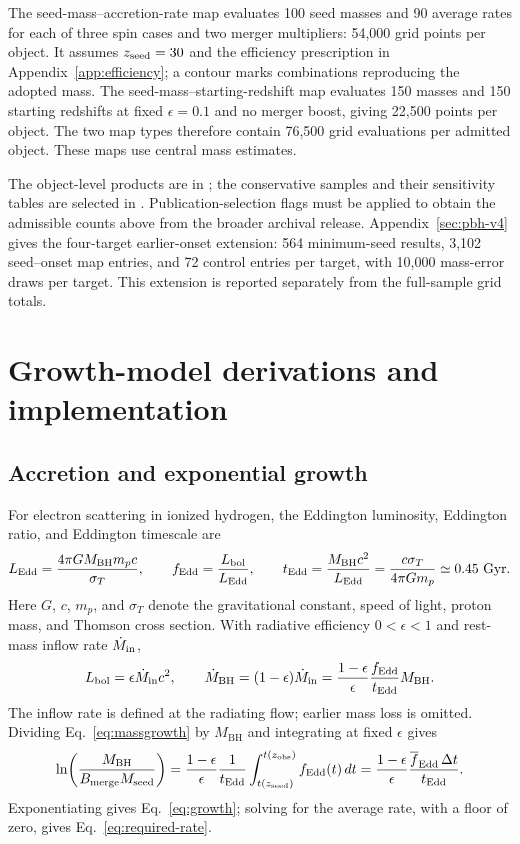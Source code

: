 \documentclass[pdflatex,sn-basic]{sn-jnl}
\newcommand{\fedd}{f_{\mathrm{Edd}}}
\newcommand{\mbh}{M_{\mathrm{BH}}}
\newcommand{\mseed}{M_{\mathrm{seed}}}
\begin{document}
The seed-mass--accretion-rate map evaluates 100 seed masses and 90 average
rates for each of three spin cases and two merger multipliers: 54,000 grid
points per object. It assumes $z_{\rm seed}=30$ and the efficiency prescription
in Appendix~\ref{app:efficiency}; a contour marks combinations reproducing the
adopted mass. The seed-mass--starting-redshift map evaluates 150 masses and
150 starting redshifts at fixed $\epsilon=0.1$ and no merger boost, giving
22,500 points per object. The two map types therefore contain 76,500 grid
evaluations per admitted object. These maps use central mass estimates.

The object-level products are in ; the conservative samples
and their sensitivity tables are selected in .
Publication-selection flags must be applied to obtain the admissible counts
above from the broader archival release. Appendix~\ref{sec:pbh-v4} gives the
four-target earlier-onset extension: 564 minimum-seed results, 3,102
seed--onset map entries, and 72 control entries per target, with 10,000
mass-error draws per target. This extension is reported separately from the
full-sample grid totals.


\FloatBarrier
\section{Growth-model derivations and implementation}
\label{app:derivations}

\subsection{Accretion and exponential growth}

For electron scattering in ionized hydrogen, the Eddington luminosity,
Eddington ratio, and Eddington timescale are
\begin{equation}
L_{\rm Edd}=\frac{4\pi G\mbh m_p c}{\sigma_T},\qquad
\fedd=\frac{L_{\rm bol}}{L_{\rm Edd}},\qquad
t_{\rm Edd}=\frac{\mbh c^2}{L_{\rm Edd}}
=\frac{c\sigma_T}{4\pi Gm_p}\simeq0.45\ {\rm Gyr}.
\label{eq:eddington}
\end{equation}
Here $G$, $c$, $m_p$, and $\sigma_T$ denote the gravitational constant,
speed of light, proton mass, and Thomson cross section. With radiative
efficiency $0<\epsilon<1$ and rest-mass inflow rate $\dot M_{\rm in}$,
\begin{equation}
L_{\rm bol}=\epsilon\dot M_{\rm in}c^2,\qquad
\dot\mbh=(1-\epsilon)\dot M_{\rm in}
=\frac{1-\epsilon}{\epsilon}\frac{\fedd}{t_{\rm Edd}}\mbh.
\label{eq:massgrowth}
\end{equation}
The inflow rate is defined at the radiating flow; earlier mass loss is omitted.
Dividing Eq.~\ref{eq:massgrowth} by $\mbh$ and integrating at fixed
$\epsilon$ gives
\begin{equation}
\ln\!\left(\frac{\mbh}{B_{\rm merge}\mseed}\right)
=\frac{1-\epsilon}{\epsilon}\frac{1}{t_{\rm Edd}}
\int_{t(z_{\rm seed})}^{t(z_{\rm obs})}\fedd(t)\,dt
=\frac{1-\epsilon}{\epsilon}
\frac{\overline{f}_{\mathrm{Edd}}\,\Delta t}{t_{\rm Edd}}.
\end{equation}
Exponentiating gives Eq.~\ref{eq:growth}; solving for the average rate,
with a floor of zero, gives Eq.~\ref{eq:required-rate}.
\end{document}
